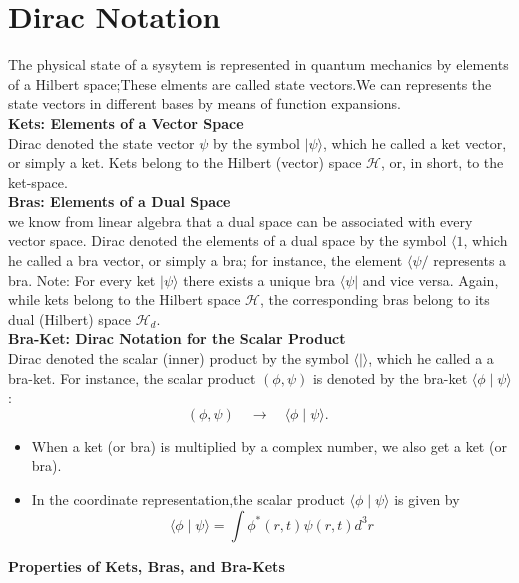 \section{Dirac Notation}
The physical state of a sysytem is represented in quantum mechanics by elements of a Hilbert space;These elments are called state vectors.We can represents the state vectors in different bases by means of function expansions.\\
\textbf{Kets: Elements of a Vector Space}\\
Dirac denoted the state vector $\psi $ by the symbol $|\psi\rangle$, which he called a ket vector, or simply a ket. Kets belong to the Hilbert (vector) space $\mathcal{H}$, or, in short, to the ket-space.\\
\textbf{Bras: Elements of a Dual Space}\\
 we know from linear algebra that a dual space can be associated with every vector space. Dirac denoted the elements of a dual space by the symbol $\langle 1$, which he called a bra vector, or simply a bra; for instance, the element $\langle\psi /$ represents a bra. Note: For every ket $|\psi\rangle$ there exists a unique bra $\langle\psi|$ and vice versa. Again, while kets belong to the Hilbert space $\mathcal{H}$, the corresponding bras belong to its dual (Hilbert) space $\mathcal{H}_{d}$.\\
 \textbf{Bra-Ket: Dirac Notation for the Scalar Product}\\
 Dirac denoted the scalar (inner) product by the symbol $\langle\mid\rangle$, which he called a a bra-ket. For instance, the scalar product $(\phi, \psi)$ is denoted by the bra-ket $\langle\phi \mid \psi\rangle$ :
 $$
 (\phi, \psi) \quad \longrightarrow \quad\langle\phi \mid \psi\rangle \text {. }
 $$
 \begin{note}
 	\begin{itemize}
 		\item When a ket (or bra) is multiplied by a complex number, we also get a ket (or bra).
 		\item In the coordinate representation,the scalar product $\langle\phi \mid \psi\rangle$ is given by\\
 		$$\langle\phi \mid \psi\rangle=\int \phi^*(r,t)\psi(r,t)d^3r$$
 	\end{itemize}
 \end{note}
\newpage
\textbf{ Properties of Kets, Bras, and Bra-Kets}  \\
